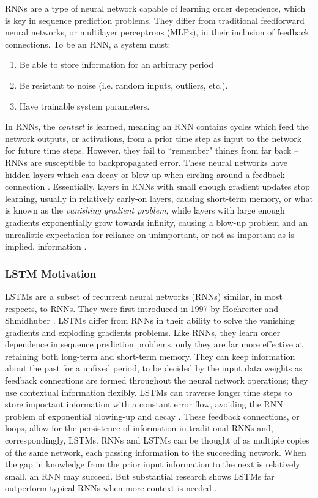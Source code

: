 \documentclass[10pt,twocolumn]{article}
\begin{document}
RNNs are a type of neural network capable of learning order dependence, which is key in sequence prediction problems. They differ from traditional feedforward neural networks, or multilayer perceptrons (MLPs), in their inclusion of feedback connections. To be an RNN, a system must:

\begin{enumerate}
    \item Be able to store information for an arbitrary period
    \item Be resistant to noise (i.e. random inputs, outliers, etc.).
    \item Have trainable system parameters.
\end{enumerate}

In RNNs, the \emph{context} is learned, meaning an RNN contains cycles which feed the network outputs, or activations, from a prior time step as input to the network for future time steps. However, they fail to ``remember" things from far back -- RNNs are susceptible to backpropagated error. These neural networks have hidden layers which can decay or blow up when circling around a feedback connection \cite{GentleIntroductionToLSTMNetworks}. Essentially, layers in RNNs with small enough gradient updates stop learning, usually in relatively early-on layers, causing short-term memory, or what is known as the \textit{vanishing gradient problem}, while layers with large enough gradients exponentially grow towards infinity, causing a blow-up problem and an unrealistic expectation for reliance on unimportant, or not as important as is implied, information \cite{IllustratedGuideToLSTMs}.

\subsubsection{LSTM Motivation}

LSTMs are a subset of recurrent neural networks (RNNs) similar, in most respects, to RNNs. They were first introduced in 1997 by Hochreiter and Shmidhuber \cite{UnderstandingLSTMs}. LSTMs differ from RNNs in their ability to solve the vanishing gradients and exploding gradients problems. Like RNNs, they learn order dependence in sequence prediction problems, only they are far more effective at retaining both long-term and short-term memory. They can keep information about the past for a unfixed period, to be decided by the input data weights as feedback connections are formed throughout the neural network operations; they use contextual information flexibly. LSTMs can traverse longer time steps to store important information with a constant error flow, avoiding the RNN problem of exponential blowing-up and decay \cite{GentleIntroductionToLSTMNetworks}. These feedback connections, or loops, allow for the persistence of information in traditional RNNs and, correspondingly, LSTMs. RNNs and LSTMs can be thought of as multiple copies of the same network, each passing information to the succeeding network. When the gap in knowledge from the prior input information to the next is relatively small, an RNN may succeed. But substantial research shows LSTMs far outperform typical RNNs when more context is needed \cite{UnderstandingLSTMs}.
\end{document}
